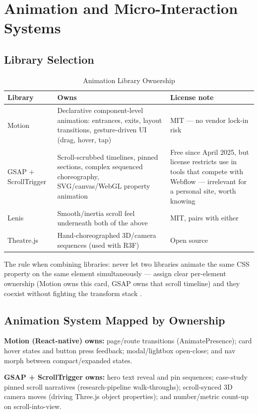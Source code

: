 \documentclass[conference]{IEEEtran}
\begin{document}
\section{Animation and Micro-Interaction Systems}

\subsection{Library Selection}
\begin{table}[h]
\centering
\caption{Animation Library Ownership}
\label{tab:animlib_full}
\begin{tabular}{L{1.5cm}L{3.0cm}L{3.5cm}}
\toprule
\textbf{Library} & \textbf{Owns} & \textbf{License note} \\
\midrule
Motion & Declarative component-level animation: entrances, exits, layout transitions, gesture-driven UI (drag, hover, tap) & MIT --- no vendor lock-in risk \\
GSAP + ScrollTrigger & Scroll-scrubbed timelines, pinned sections, complex sequenced choreography, SVG/canvas/WebGL property animation & Free since April 2025, but license restricts use in tools that compete with Webflow --- irrelevant for a personal site, worth knowing \\
Lenis & Smooth/inertia scroll feel underneath both of the above & MIT, pairs with either \\
Theatre.js & Hand-choreographed 3D/camera sequences (used with R3F) & Open source \\
\bottomrule
\end{tabular}
\end{table}

The rule when combining libraries: never let two libraries animate the same CSS property on the same element simultaneously --- assign clear per-element ownership (Motion owns this card, GSAP owns that scroll timeline) and they coexist without fighting the transform stack \cite{hontran_gsap2026}.

\subsection{Animation System Mapped by Ownership}
\textbf{Motion (React-native) owns:} page/route transitions (AnimatePresence); card hover states and button press feedback; modal/lightbox open-close; and nav morph between compact/expanded states.

\textbf{GSAP + ScrollTrigger owns:} hero text reveal and pin sequences; case-study pinned scroll narratives (research-pipeline walk-throughs); scroll-synced 3D camera moves (driving Three.js object properties); and number/metric count-up on scroll-into-view.
\end{document}
